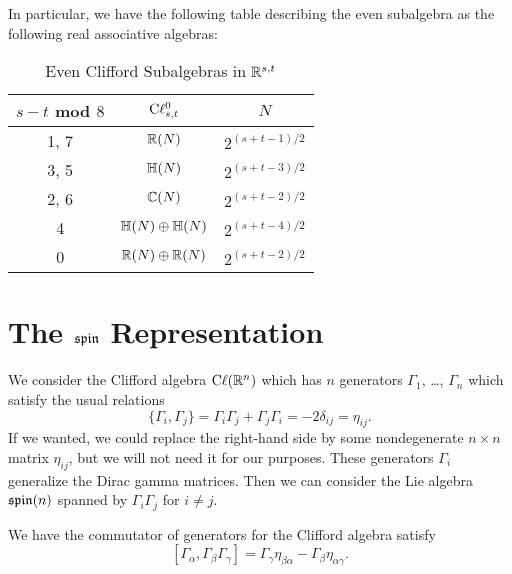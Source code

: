 In particular, we have the following table describing the even
subalgebra as the following real associative algebras:

\begin{table}[h!]
\centering
\begin{tabular}{|c|c|c|} \hline
  $s-t$ mod $8$ & $\mathrm{C}\ell_{s,t}^{0}$ & $N$ \\\hline
           1, 7 &       $\mathbb{R}(N)$ & $2^{(s+t-1)/2}$\\
           3, 5 &       $\mathbb{H}(N)$ & $2^{(s+t-3)/2}$\\ \hline
           2, 6 &       $\mathbb{C}(N)$ & $2^{(s+t-2)/2}$\\
              4 & $\mathbb{H}(N)\oplus\mathbb{H}(N)$ & $2^{(s+t-4)/2}$\\
              0 & $\mathbb{R}(N)\oplus\mathbb{R}(N)$ & $2^{(s+t-2)/2}$\\ \hline
\end{tabular}
\caption{Even Clifford Subalgebras in $\mathbb{R}^{s,t}$}
\end{table}

\section{The $\operatorname{\mathfrak{spin}}$ Representation}

\M
We consider the Clifford algebra $\mathrm{C}\ell(\mathbb{R}^{n})$ which has $n$ generators
$\Gamma_{1}$, \dots, $\Gamma_{n}$ which satisfy the usual relations
\begin{equation}\label{eq:spin:clifford-anticommutator}
\{\Gamma_{i}, \Gamma_{j}\} = \Gamma_{i}\Gamma_{j} + \Gamma_{j}\Gamma_{i} = -2\delta_{ij} = \eta_{ij}.
\end{equation}
If we wanted, we could replace the right-hand side by some nondegenerate
$n\times n$ matrix $\eta_{ij}$, but we will not need it for our purposes.
These generators $\Gamma_{i}$ generalize the Dirac gamma matrices. Then we
can consider the Lie algebra $\operatorname{\mathfrak{spin}}(n)$ spanned by $\Gamma_{i}\Gamma_{j}$ for
$i\neq j$.

\begin{lemma}\label{lemma:spin:clifford-algebra:commutator-of-one-and-two}
We have the commutator of generators for the Clifford algebra satisfy
$$[\Gamma_{\alpha}, \Gamma_{\beta}\Gamma_{\gamma}]=\Gamma_{\gamma}\eta_{\beta\alpha}-\Gamma_{\beta}\eta_{\alpha\gamma}.$$
\end{lemma}

